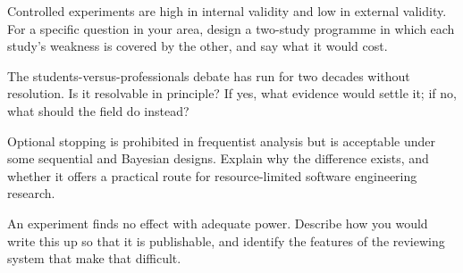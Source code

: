 \begin{reviewq}
  \item Controlled experiments are high in internal validity and low in
    external validity. For a specific question in your area, design a two-study
    programme in which each study's weakness is covered by the other, and say
    what it would cost.
  \item The students-versus-professionals debate has run for two decades
    without resolution. Is it resolvable in principle? If yes, what evidence
    would settle it; if no, what should the field do instead?
  \item Optional stopping is prohibited in frequentist analysis but is
    acceptable under some sequential and Bayesian designs. Explain why the
    difference exists, and whether it offers a practical route for
    resource-limited software engineering research.
  \item An experiment finds no effect with adequate power. Describe how you
    would write this up so that it is publishable, and identify the features of
    the reviewing system that make that difficult.
\end{reviewq}
